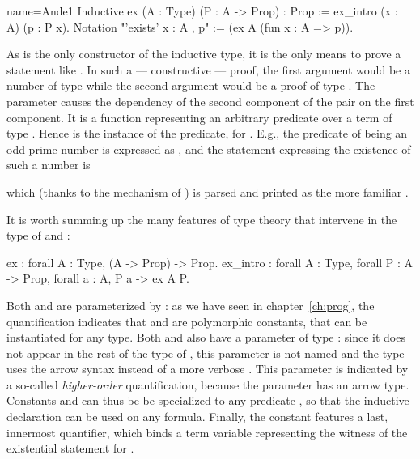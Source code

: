 \begin{coq}{name=Ande1}{}
Inductive ex (A : Type) (P : A -> Prop) : Prop :=
  ex_intro (x : A) (p : P x).
Notation "'exists' x : A , p" := (ex A (fun x : A => p)).
\end{coq}

As   is the only constructor of the  inductive
type, it is the only means to prove a statement like
.  In such a --- constructive --- proof, the first
argument would be a number
 of type  while the second argument would be a proof  of type
.  The parameter  causes the dependency of the
second component of the pair on the first component. It is a function
representing an arbitrary predicate over a term of
type .  Hence  is the instance of the predicate, for .  E.g.,
the predicate of being an odd prime number is expressed as
, and the statement expressing the
existence of such a number is

\centerline{} 
which (thanks to the  mechanism of \Coq{}) is parsed and
printed as the more familiar .

It is worth summing up the many features of type theory that
intervene in the type of  and :

\begin{coq}{}{}
ex : forall A : Type, (A -> Prop) -> Prop.
ex_intro : forall A : Type, forall P : A -> Prop, forall a : A, P a -> ex A P.
\end{coq}

Both  and  are parameterized by : as
we have seen in chapter~\ref{ch:prog}, the 
quantification indicates that  and  are polymorphic
constants, that can be instantiated for any type. Both  and
 also have a parameter of type  : since it
does not appear in the rest of the type of , this parameter is
not named and the type uses the arrow syntax instead of a more verbose
. This parameter is
indicated by a so-called \emph{higher-order} quantification, because
the parameter has an arrow type. Constants   and 
can thus be  be specialized to any predicate , so that the 
inductive declaration can be used on any formula. Finally, the
 constant features a last, innermost 
quantifier, which binds a term variable  representing the witness
of the existential statement for .\\

